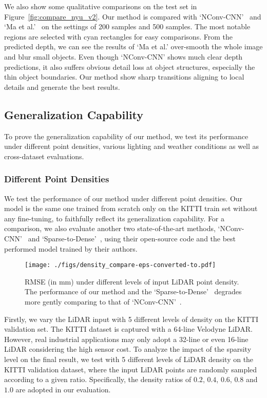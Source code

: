 \documentclass[journal]{IEEEtran}
\begin{document}
We also show some qualitative comparisons on the test set in Figure~\ref{fig:compare_nyu_v2}.
Our method is compared with `NConv-CNN'~\cite{cnn_confidence} and `Ma et al.'~\cite{sparse_to_dense} on the settings of 200 samples and 500 samples.
The most notable regions are selected with cyan rectangles for easy comparisons.
From the predicted depth, we can see the results of `Ma et al.' over-smooth the whole image and blur small objects. 
Even though `NConv-CNN' shows much clear depth predictions, it also suffers obvious detail loss at object structures, especially the thin object boundaries.
Our method show sharp transitions aligning to local details and generate the best results.

\subsection{Generalization Capability}
\label{subsec:generalization_capability}
To prove the generalization capability of our method,
we test its performance under different point densities, various lighting and weather conditions as well as cross-dataset evaluations.


\subsubsection{Different Point Densities}
We test the performance of our method under different point densities.
Our model is the same one trained from scratch only on the KITTI train set without any fine-tuning, to faithfully reflect its generalization capability.
For a comparison, we also evaluate another two state-of-the-art methods, `NConv-CNN'~\cite{cnn_confidence} and `Sparse-to-Dense'~\cite{self_supervised},
using their open-source code and the best performed model trained by their authors. 


\begin{figure}
   \begin{center}
   \texttt{[image: ./figs/density\_compare-eps-converted-to.pdf]}
   \end{center}
      \caption{
      RMSE (in $\mathrm{mm}$) under different levels of input LiDAR point density. The performance of our method and the `Sparse-to-Dense'~\cite{self_supervised} degrades more gently comparing to that of `NConv-CNN'~\cite{cnn_confidence}. }
   \label{fig:density_compare}
\end{figure}

Firstly, we vary the LiDAR input with 5 different levels of density on the KITTI validation set. 
The KITTI dataset is captured with a 64-line Velodyne LiDAR.
However, real industrial applications may only adopt a 32-line or even 16-line LiDAR considering the high sensor cost.
To analyze the impact of the sparsity level on the final result, we test with 5 different levels of LiDAR density on the KITTI validation dataset,
where the input LiDAR points are randomly sampled according to a given ratio.
Specifically, the density ratios of $0.2$, $0.4$, $0.6$, $0.8$ and $1.0$ are adopted in our evaluation. 
\end{document}
